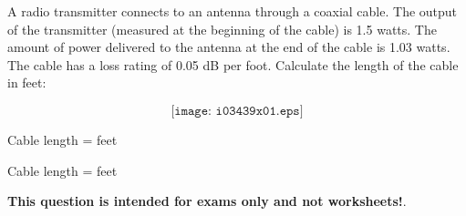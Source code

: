 

A radio transmitter connects to an antenna through a coaxial cable.  The output of the transmitter (measured at the beginning of the cable) is 1.5 watts.  The amount of power delivered to the antenna at the end of the cable is 1.03 watts.  The cable has a loss rating of 0.05 dB per foot.  Calculate the length of the cable in feet:

$$\texttt{[image: i03439x01.eps]}$$

Cable length = \underbar{\hskip 50pt} feet







Cable length =  feet







{\bf This question is intended for exams only and not worksheets!}.



